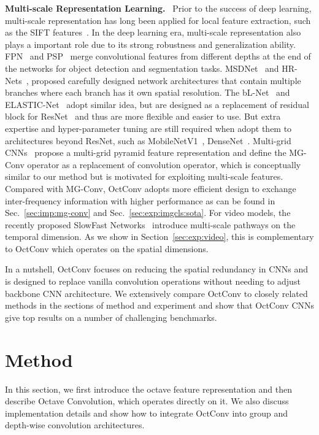 \documentclass[10pt,twocolumn,letterpaper]{article}
\newcommand{\hiConv}[0]{OctConv\xspace}
\newcommand{\hiConvName}[0]{Octave Convolution\xspace}
\newcommand{\myparagraph}[1]{\vspace{1pt}\noindent\textbf{#1.}~}
\begin{document}
\myparagraph{Multi-scale Representation Learning}
Prior to the success of deep learning, multi-scale representation has long been applied for local feature extraction, such as the SIFT features~\cite{lowe2004distinctive}. In the deep learning era, multi-scale representation also plays a important role due to its strong robustness and generalization ability. FPN~\cite{FPN} and PSP~\cite{PSP} merge convolutional features from different depths at the end of the networks for object detection and segmentation tasks. MSDNet~\cite{huang2018multi} and HR-Nets~\cite{sun2019deep}, proposed carefully designed network architectures that contain multiple branches where each branch has it own spatial resolution. The bL-Net~\cite{bLNet} and ELASTIC-Net~\cite{ELASTIC} adopt similar idea, but are designed as a replacement of residual block for ResNet~\cite{ResNetV1,ResNetV2} and thus are more flexible and easier to use. But extra expertise and hyper-parameter tuning are still required when adopt them to architectures beyond ResNet, such as MobileNetV1~\cite{MobileNetV1}, DenseNet~\cite{densenet}. 
Multi-grid CNNs~\cite{ke2017multigrid} propose a multi-grid pyramid feature representation and define the MG-Conv operator as a replacement of convolution operator, which is conceptually similar to our method but is motivated for exploiting multi-scale features. Compared with MG-Conv, \hiConv adopts more efficient design to exchange inter-frequency information with higher performance as can be found in Sec.~\ref{sec:imp:mg-conv} and Sec.~\ref{sec:exp:imgcls:sota}. 
For video models, the recently proposed SlowFast Networks~\cite{SlowFast} introduce multi-scale pathways on the temporal dimension. As we show in Section~\ref{sec:exp:video}, this is complementary to \hiConv which operates on the spatial dimensions.

In a nutshell, \hiConv focuses on reducing the spatial redundancy in CNNs and is designed to replace vanilla convolution operations without needing to adjust backbone CNN architecture. We extensively compare \hiConv to closely related methods in the sections of method and experiment and show that \hiConv CNNs give top results on a number of challenging benchmarks. 

\section{Method}

In this section, we first introduce the octave feature representation and then describe  \hiConvName, which operates directly on it. We also discuss implementation details and show how to integrate \hiConv into group and depth-wise convolution architectures.
\end{document}
